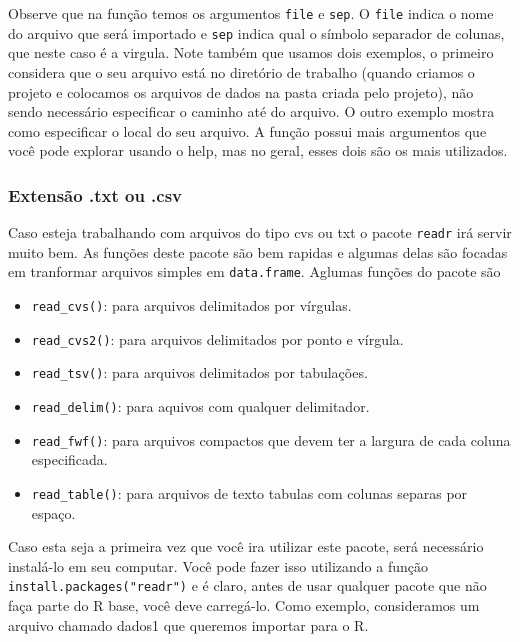 \documentclass[
  letterpaper,
  DIV=11,
  numbers=noendperiod]{scrreprt}
\begin{document}
Observe que na função temos os argumentos \texttt{file} e \texttt{sep}.
O \texttt{file} indica o nome do arquivo que será importado e
\texttt{sep} indica qual o símbolo separador de colunas, que neste caso
é a virgula. Note também que usamos dois exemplos, o primeiro considera
que o seu arquivo está no diretório de trabalho (quando criamos o
projeto e colocamos os arquivos de dados na pasta criada pelo projeto),
não sendo necessário especificar o caminho até do arquivo. O outro
exemplo mostra como especificar o local do seu arquivo. A função possui
mais argumentos que você pode explorar usando o help, mas no geral,
esses dois são os mais utilizados.

\hypertarget{extensuxe3o-.txt-ou-.csv}{%
\subsubsection{Extensão .txt ou .csv}\label{extensuxe3o-.txt-ou-.csv}}

Caso esteja trabalhando com arquivos do tipo cvs ou txt o pacote
\texttt{readr} irá servir muito bem. As funções deste pacote são bem
rapidas e algumas delas são focadas em tranformar arquivos simples em
\texttt{data.frame}. Aglumas funções do pacote são

\begin{itemize}
\item
  \texttt{read\_cvs()}: para arquivos delimitados por vírgulas.
\item
  \texttt{read\_cvs2()}: para arquivos delimitados por ponto e vírgula.
\item
  \texttt{read\_tsv()}: para arquivos delimitados por tabulações.
\item
  \texttt{read\_delim()}: para aquivos com qualquer delimitador.
\item
  \texttt{read\_fwf()}: para arquivos compactos que devem ter a largura
  de cada coluna especificada.
\item
  \texttt{read\_table()}: para arquivos de texto tabulas com colunas
  separas por espaço.
\end{itemize}

Caso esta seja a primeira vez que você ira utilizar este pacote, será
necessário instalá-lo em seu computar. Você pode fazer isso utilizando a
função \texttt{install.packages("readr")} e é claro, antes de usar
qualquer pacote que não faça parte do R base, você deve carregá-lo. Como
exemplo, consideramos um arquivo chamado dados1 que queremos importar
para o R.
\end{document}
